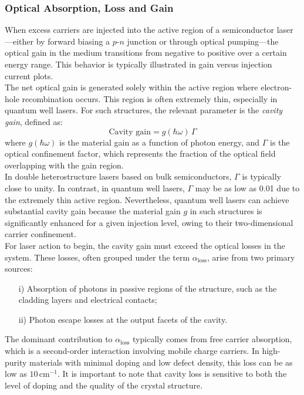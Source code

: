 \subsubsection{Optical Absorption, Loss and Gain}
When excess carriers are injected into the active region of a semiconductor laser—either by forward biasing a \( p\text{-}n \) junction or through optical pumping—the optical gain in the medium transitions from negative to positive over a certain energy range. This behavior is typically illustrated in gain versus injection current plots.\\
The net optical gain is generated solely within the active region where electron-hole recombination occurs. This region is often extremely thin, especially in quantum well lasers. For such structures, the relevant parameter is the \textit{cavity gain}, defined as:
\begin{equation}
	\text{Cavity gain} = g(\hbar \omega) \, \Gamma
\end{equation}
where \( g(\hbar \omega) \) is the material gain as a function of photon energy, and \( \Gamma \) is the optical confinement factor, which represents the fraction of the optical field overlapping with the gain region.\\
In double heterostructure lasers based on bulk semiconductors, \( \Gamma \) is typically close to unity. In contrast, in quantum well lasers, \( \Gamma \) may be as low as 0.01 due to the extremely thin active region. Nevertheless, quantum well lasers can achieve substantial cavity gain because the material gain \( g \) in such structures is significantly enhanced for a given injection level, owing to their two-dimensional carrier confinement.\\
For laser action to begin, the cavity gain must exceed the optical losses in the system. These losses, often grouped under the term \( \alpha_{\text{loss}} \), arise from two primary sources:
\begin{itemize}
	\item[i)] Absorption of photons in passive regions of the structure, such as the cladding layers and electrical contacts;
	\item[ii)] Photon escape losses at the output facets of the cavity.
\end{itemize}
The dominant contribution to \( \alpha_{\text{loss}} \) typically comes from free carrier absorption, which is a second-order interaction involving mobile charge carriers. In high-purity materials with minimal doping and low defect density, this loss can be as low as \( 10 \, \text{cm}^{-1} \). It is important to note that cavity loss is sensitive to both the level of doping and the quality of the crystal structure.
